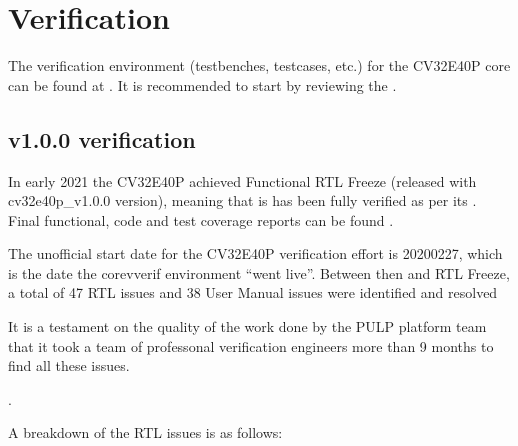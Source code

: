 \documentclass[letterpaper,10pt,english]{sphinxmanual}
\begin{document}
\sphinxstepscope


\chapter{Verification}
\label{\detokenize{verification:verification}}\label{\detokenize{verification:id1}}\label{\detokenize{verification::doc}}
\sphinxAtStartPar
The verification environment (testbenches, testcases, etc.) for the CV32E40P
core can be found at  .
It is recommended to start by reviewing the
.


\section{v1.0.0 verification}
\label{\detokenize{verification:v1-0-0-verification}}
\sphinxAtStartPar
In early 2021 the CV32E40P achieved Functional RTL Freeze (released with cv32e40p\_v1.0.0 version), meaning that is has been fully verified as per its
.
Final functional, code and test coverage reports can be found .

\sphinxAtStartPar
The unofficial start date for the CV32E40P verification effort is 2020\sphinxhyphen{}02\sphinxhyphen{}27,
which is the date the core\sphinxhyphen{}v\sphinxhyphen{}verif environment “went live”.  Between then and
RTL Freeze, a total of 47 RTL issues and 38 User Manual issues were identified
and resolved %
\begin{footnote}[1]\sphinxAtStartFootnote
It is a testament on the quality of the work done by the PULP platform team
that it took a team of professonal verification engineers more than 9 months
to find all these issues.
%
\end{footnote}.

\sphinxAtStartPar
A breakdown of the RTL issues is as follows:
\end{document}
